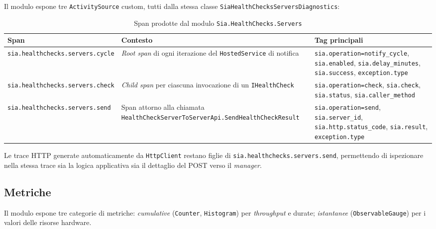 Il modulo espone tre \texttt{ActivitySource} custom, tutti dalla stessa classe
\texttt{Sia\-Health\-Checks\-Servers\-Diagnostics}:

\begin{table}[h]
\centering
\caption{Span prodotte dal modulo \texttt{Sia.HealthChecks.Servers}}
\label{tab:span-healthchecks}
\begin{tabularx}{\textwidth}{|l|X|X|}
\hline
\textbf{Span} & \textbf{Contesto} & \textbf{Tag principali} \\
\hline
\texttt{sia.healthchecks.servers.cycle} &
\emph{Root span} di ogni iterazione del \texttt{HostedService} di notifica &
\texttt{sia.operation=notify\_cycle}, \texttt{sia.enabled}, \texttt{sia.delay\_minutes}, \texttt{sia.success}, \texttt{exception.type} \\
\hline
\texttt{sia.healthchecks.servers.check} &
\emph{Child span} per ciascuna invocazione di un \texttt{IHealthCheck} &
\texttt{sia.operation=check}, \texttt{sia.check}, \texttt{sia.status}, \texttt{sia.caller\_method} \\
\hline
\texttt{sia.healthchecks.servers.send} &
Span attorno alla chiamata \texttt{HealthCheckServerToServerApi.SendHealthCheckResult} &
\texttt{sia.operation=send}, \texttt{sia.server\_id}, \texttt{sia.http.status\_code}, \texttt{sia.result}, \texttt{exception.type} \\
\hline
\end{tabularx}
\end{table}

Le trace HTTP generate automaticamente da \texttt{HttpClient} restano figlie di
\texttt{sia.healthchecks.servers.send}, permettendo di ispezionare nella stessa trace sia la
logica applicativa sia il dettaglio del POST verso il \emph{manager}.

\subsection{Metriche}

Il modulo espone tre categorie di metriche: \emph{cumulative} (\texttt{Counter},
\texttt{Histogram}) per \emph{throughput} e durate; \emph{istantanee}
(\texttt{ObservableGauge}) per i valori delle risorse hardware.

